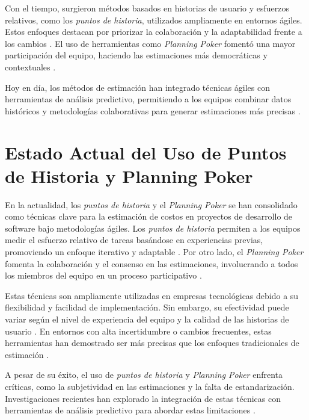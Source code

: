 Con el tiempo, surgieron métodos basados en historias de usuario y esfuerzos relativos, como los \textit{puntos de historia}, utilizados ampliamente en entornos ágiles. Estos enfoques destacan por priorizar la colaboración y la adaptabilidad frente a los cambios \parencite{cohn2004userstories}. El uso de herramientas como \textit{Planning Poker} fomentó una mayor participación del equipo, haciendo las estimaciones más democráticas y contextuales \parencite{cohn2005agileestimating}.

Hoy en día, los métodos de estimación han integrado técnicas ágiles con herramientas de análisis predictivo, permitiendo a los equipos combinar datos históricos y metodologías colaborativas para generar estimaciones más precisas \parencite{larman2004agile}.

\section{Estado Actual del Uso de Puntos de Historia y Planning Poker}
En la actualidad, los \textit{puntos de historia} y el \textit{Planning Poker} se han consolidado como técnicas clave para la estimación de costos en proyectos de desarrollo de software bajo metodologías ágiles. Los \textit{puntos de historia} permiten a los equipos medir el esfuerzo relativo de tareas basándose en experiencias previas, promoviendo un enfoque iterativo y adaptable \parencite{cohn2005agileestimating}. Por otro lado, el \textit{Planning Poker} fomenta la colaboración y el consenso en las estimaciones, involucrando a todos los miembros del equipo en un proceso participativo \parencite{schwaber2020scrumguide}.

Estas técnicas son ampliamente utilizadas en empresas tecnológicas debido a su flexibilidad y facilidad de implementación. Sin embargo, su efectividad puede variar según el nivel de experiencia del equipo y la calidad de las historias de usuario \parencite{larman2004agile}. En entornos con alta incertidumbre o cambios frecuentes, estas herramientas han demostrado ser más precisas que los enfoques tradicionales de estimación \parencite{cohn2004userstories}.

A pesar de su éxito, el uso de \textit{puntos de historia} y \textit{Planning Poker} enfrenta críticas, como la subjetividad en las estimaciones y la falta de estandarización. Investigaciones recientes han explorado la integración de estas técnicas con herramientas de análisis predictivo para abordar estas limitaciones \parencite{boehm2020software}.

